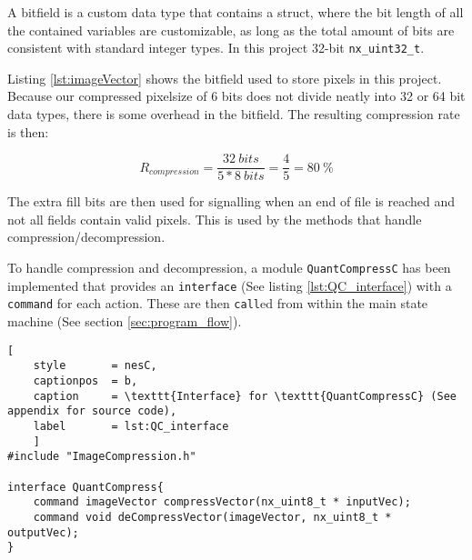 A bitfield is a custom data type that contains a struct, where the bit length of all the contained variables are customizable, as long as the total amount of bits are consistent with standard integer types.
In this project 32-bit \texttt{nx\_uint32\_t}.

Listing \ref{lst:imageVector} shows the bitfield used to store pixels in this project.
Because our compressed pixelsize of 6 bits does not divide neatly into 32 or 64 bit data types, there is some overhead in the bitfield.
The resulting compression rate is then:

\begin{equation}
R_{compression} = 
\dfrac{32\ bits}
{5 * 8\ bits} =
\dfrac{4}{5} = 
80\ \%
\end{equation}

The extra fill bits are then used for signalling when an end of file is reached and not all fields contain valid pixels.
This is used by the methods that handle compression/decompression. 

To handle compression and decompression, a module \texttt{QuantCompressC} has been implemented that provides an \texttt{interface} (See listing \ref{lst:QC_interface}) with a \texttt{command} for each action.
These are then \texttt{call}ed from within the main state machine (See section \ref{sec:program_flow}).

\begin{lstlisting}[
	style		= nesC, 
	captionpos	= b, 
	caption		= \texttt{Interface} for \texttt{QuantCompressC} (See appendix for source code),
	label		= lst:QC_interface
	]
#include "ImageCompression.h"

interface QuantCompress{
	command imageVector compressVector(nx_uint8_t * inputVec);
	command void deCompressVector(imageVector, nx_uint8_t * outputVec);
}
\end{lstlisting}

